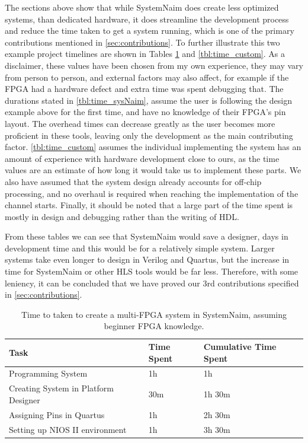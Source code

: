 The sections above show that while SystemNaim does create less optimized systems, than dedicated hardware, it does streamline the development process and reduce the time taken to get a system running, which is one of the primary contributions mentioned in \autoref{sec:contributions}. To further illustrate this two example project timelines are shown in Tables \ref{tbl:time_sysNaim} and \ref{tbl:time_custom}. As a disclaimer, these values have been chosen from my own experience, they may vary from person to person, and external factors may also affect, for example if the FPGA had a hardware defect and extra time was spent debugging that. The durations stated in \autoref{tbl:time_sysNaim}, assume the user is following the design example above for the first time, and have no knowledge of their FPGA's pin layout. The overhead times can decrease greatly as the user becomes more proficient in these tools, leaving only the development as the main contributing factor. \autoref{tbl:time_custom} assumes the individual implementing the system has an amount of experience with hardware development close to ours, as the time values are an estimate of how long it would take us to implement these parts. We also have assumed that the system design already accounts for off-chip processing, and no overhaul is required when reaching the implementation of the channel starts. Finally, it should be noted that a large part of the time spent is mostly in design and debugging rather than the writing of HDL.

From these tables we can see that SystemNaim would save a designer, days in development time and this would be for a relatively simple system. Larger systems take even longer to design in Verilog and Quartus, but the increase in time for SystemNaim or other HLS tools would be far less. Therefore, with some leniency, it can be concluded that we have proved our 3rd contributions specified in \autoref{sec:contributions}.


\begin{table}[]
\begin{tabular}{l|l|l}
Task                                 & Time Spent & Cumulative Time Spent \\ \hline
Programming System                   & 1h         & 1h                    \\
Creating System in Platform Designer & 30m        & 1h 30m                \\
Assigning Pins in Quartus            & 1h         & 2h 30m                \\
Setting up NIOS II environment       & 1h         & 3h 30m               
\end{tabular}
\caption{Time to taken to create a multi-FPGA system in SystemNaim, assuming beginner FPGA knowledge.}
\label{tbl:time_sysNaim}
\end{table}


